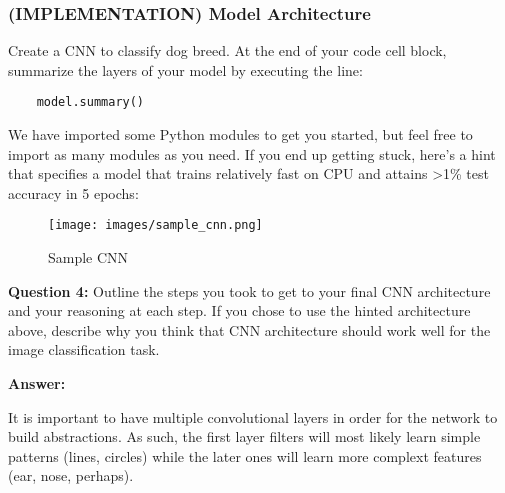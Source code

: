 \documentclass[11pt]{article}
\makeatletter
\def\maxwidth{\ifdim\Gin@nat@width>\linewidth\linewidth
    \else\Gin@nat@width\fi}
\let\Oldincludegraphics\includegraphics
\renewcommand{\includegraphics}[1]{\Oldincludegraphics[width=.8\maxwidth]{#1}}
\makeatother
\begin{document}
    \subsubsection{(IMPLEMENTATION) Model
Architecture}\label{implementation-model-architecture}

Create a CNN to classify dog breed. At the end of your code cell block,
summarize the layers of your model by executing the line:

\begin{verbatim}
    model.summary()
\end{verbatim}

We have imported some Python modules to get you started, but feel free
to import as many modules as you need. If you end up getting stuck,
here's a hint that specifies a model that trains relatively fast on CPU
and attains \textgreater{}1\% test accuracy in 5 epochs:

\begin{figure}
\centering
\texttt{[image: images/sample\_cnn.png]}
\caption{Sample CNN}
\end{figure}

\textbf{Question 4:} Outline the steps you took to get to your final CNN
architecture and your reasoning at each step. If you chose to use the
hinted architecture above, describe why you think that CNN architecture
should work well for the image classification task.

\textbf{Answer:}

    It is important to have multiple convolutional layers in order for the
network to build abstractions. As such, the first layer filters will
most likely learn simple patterns (lines, circles) while the later ones
will learn more complext features (ear, nose, perhaps).
\end{document}

